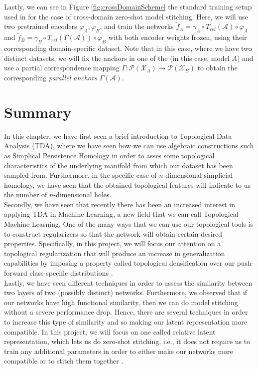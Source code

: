 \documentclass[../main.tex]{subfiles}
\begin{document}
Lastly, we can see in Figure \ref{fig:crossDomainScheme} the standard training setup used in \cite{moschella_relative_2022} for the case of cross-domain zero-shot model stitching. Here, we will use two pretrained encoders $\varphi_A, \varphi_B$, and train the networks $\tilde{f}_{A}=\gamma_A \circ T_{rel}(\mathcal{A})  \circ \varphi_A$ and $\tilde{f}_{B}=\gamma_B \circ T_{rel}(\Gamma(\mathcal{A}))  \circ \varphi_B$ with both encoder weights frozen, using their corresponding domain-specific dataset. Note that in this case, where we have two distinct datasets, we will fix the anchors in one of the (in this case, model $A$) and use a partial correspondence mapping $\Gamma: \mathcal{P}(\mathcal{X}_A) \to \mathcal{P}(\mathcal{X}_B)$ to obtain the corresponding \emph{parallel anchors $\Gamma(\mathcal{A})$}.



\section{Summary}
In this chapter, we have first seen a brief introduction to Topological Data Analysis (TDA), where we have seen how we can use algebraic constructions such as Simplical Persistence Homology in order to asses some topological characteristics of the underlying manifold from which our dataset has been sampled from. Furthermore, in the specific case of $n$-dimensional simplicial homology, we have seen that the obtained topological features will indicate to us the number of $n$-dimensional holes.\\

Secondly, we have seen that recently there has been an increased interest in applying TDA in Machine Learning, a new field that we can call Topological Machine Learning. One of the many ways that we can use our topological tools is to construct regularizers so that the network will obtain certain desired properties. Specifically, in this project, we will focus our attention on a topological regularization that will produce an increase in generalization capabilities by imposing a property called topological densification over our push-forward class-specific distributions \cite{hofer_densified_2021}.\\

Lastly, we have seen different techniques in order to assess the similarity between two layers of two (possibly distinct) networks. Furthermore, we observed that if our networks have high functional similarity, then we can do model stitching without a severe performance drop. Hence, there are several techniques in order to increase this type of similarity and so making our latent representation more compatible. In this project, we will focus on one called relative latent representation, which lets us do zero-shot stitching, i.e., it does not require us to train any additional parameters in order to either make our networks more compatible or to stitch them together \cite{moschella_relative_2022}.  
\end{document}

